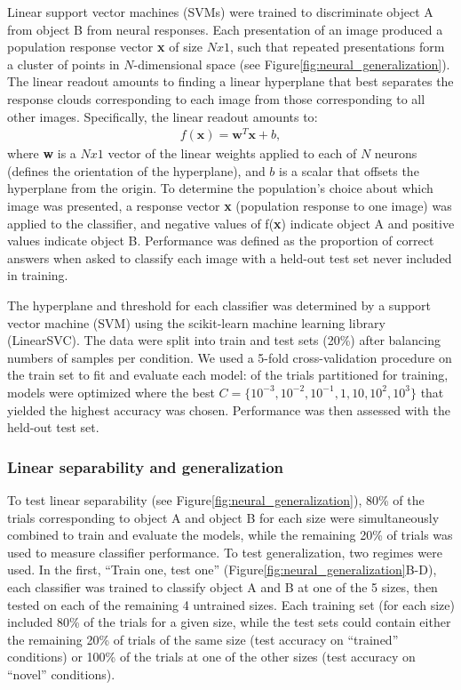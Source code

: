 Linear support vector machines (SVMs) were trained to discriminate object A from object B from neural responses. Each presentation of an image produced a population response vector \textbf{x} of size $Nx1$, such that repeated presentations form a cluster of points in $N$-dimensional space (see Figure\ref{fig:neural_generalization}). The linear readout amounts to finding a linear hyperplane that best separates the response clouds corresponding to each image from those corresponding to all other images. Specifically, the linear readout amounts to\cite{Rust2010SelectivityIT, Hung2005, Li2009}: 
\begin{align}
f(\textbf{x})=\textbf{w}^T\textbf{x} + b, 
\end{align}
where \textbf{w} is a $Nx1$ vector of the linear weights applied to each of $N$ neurons (defines the orientation of the hyperplane), and $b$ is a scalar that offsets the hyperplane from the origin. To determine the population’s choice about which image was presented, a response vector \textbf{x} (population response to one image) was applied to the classifier, and negative values of f(\textbf{x}) indicate object A and positive values indicate object B. Performance was defined as the proportion of correct answers when asked to classify each image with a held-out test set never included in training. 

The hyperplane and threshold for each classifier was determined by a support vector machine (SVM) using the scikit-learn machine learning library (LinearSVC\cite{Pedregosa2011}). The data were split into train and test sets (20\%) after balancing numbers of samples per condition. We used a 5-fold cross-validation procedure on the train set to fit and evaluate each model:  of the trials partitioned for training, models were optimized where the best $C=\{10^{-3}, 10^{-2}, 10^{-1}, 1, 10, 10^2, 10^3\}$ that yielded the highest accuracy was chosen. Performance was then assessed with the held-out test set. 

\subsubsection{Linear separability and generalization}
To test linear separability (see Figure\ref{fig:neural_generalization}), 80\% of the trials corresponding to object A and object B for each size were simultaneously combined to train and evaluate the models, while the remaining 20\% of trials was used to measure classifier performance. To test generalization, two regimes were used. In the first, ``Train one, test one'' (Figure\ref{fig:neural_generalization}B-D), each classifier was trained to classify object A and B at one of the 5 sizes, then tested on each of the remaining 4 untrained sizes. Each training set (for each size) included 80\% of the trials for a given size, while the test sets could contain either the remaining 20\% of trials of the same size (test accuracy on ``trained'' conditions) or 100\% of the trials at one of the other sizes (test accuracy on ``novel'' conditions). 

